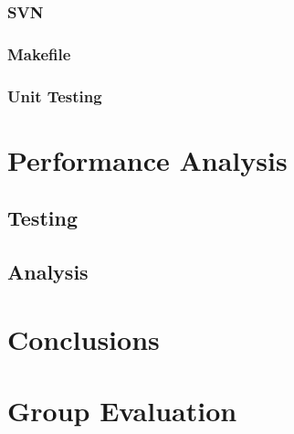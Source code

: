 \documentclass[12pt]{report}
\begin{document}
      \subsection{SVN} %
      \subsection{Makefile} %
      \subsection{Unit Testing} %

\chapter{Performance Analysis}
   \section{Testing} %
   \section{Analysis} %
   
   

\chapter{Conclusions} %

\chapter{Group Evaluation} %
\end{document}
